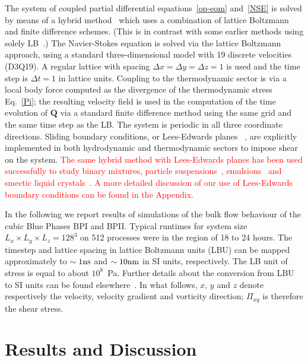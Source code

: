 \documentclass[8.5pt,twoside,twocolumn]{article}
\newcommand{\rev}[1]{{\textcolor{red}{#1}}}
\begin{document}
The system of coupled partial differential equations~\ref{op-eom}
and~\ref{NSE} is solved by means of a hybrid method~\cite{Marenduzzo:2007}
which uses a combination of lattice Boltzmann and finite difference schemes.
(This is in contrast with some earlier methods using solely
LB~\cite{Denniston:2001, Denniston:2004}.)
The Navier-Stokes
equation is solved via the lattice Boltzmann approach, using a standard
three-dimensional model with 19 discrete velocities (D3Q19).
A regular lattice with spacing $\Delta x = \Delta y = \Delta z = 1$ is
used and the time step is $\Delta t = 1$ in lattice units.
Coupling to the thermodynamic sector is via a
local body force computed as the divergence of the thermodynamic
stress Eq.~\ref{Pi}; the resulting velocity field is used in the computation
of the time evolution of $\mathbf{Q}$ via a standard finite difference
method using the same grid and the same time step as the LB. The system
is periodic in all three coordinate directions. Sliding
boundary conditions, or Lees-Edwards planes ~\cite{Wagner:2002}, are explicitly implemented
in both hydrodynamic and thermodynamic sectors to impose shear on the
system. 
\rev{
The same hybrid method with Lees-Edwards planes
has been used successfully to study binary mixtures, particle suspensions~\cite{MacMeccan:2009, Aidun:2010}, 
emulsions~\cite{Frijters:2012} and smectic liquid crystals~\cite{Henrich:2012a}.
A more detailed discussion of our use of Lees-Edwards boundary conditions can be found in the Appendix.
}

In the following we report results of simulations of the bulk flow behaviour of the cubic Blue 
Phases BPI and BPII.
Typical runtimes for system size $L_x\times L_y\times L_z=128^3$ on 512 processes were in the region of 18 to 24 hours.  
The timestep and lattice spacing in lattice Boltzmann units (LBU) can be mapped
approximately to $\sim 1 {\rm ns}$ and $\sim 10{\rm nm}$ in SI units, respectively. The LB unit of stress
is equal to about $10^8$~Pa. Further details about the conversion 
from LBU to SI units can be found elsewhere~\cite{Henrich:2011a,Henrich:2010b}.
In what follows, $x$, $y$ and $z$ denote respectively the velocity, velocity
gradient and vorticity direction; $\Pi_{xy}$ is therefore the shear stress.

\section{Results and Discussion}
\end{document}
